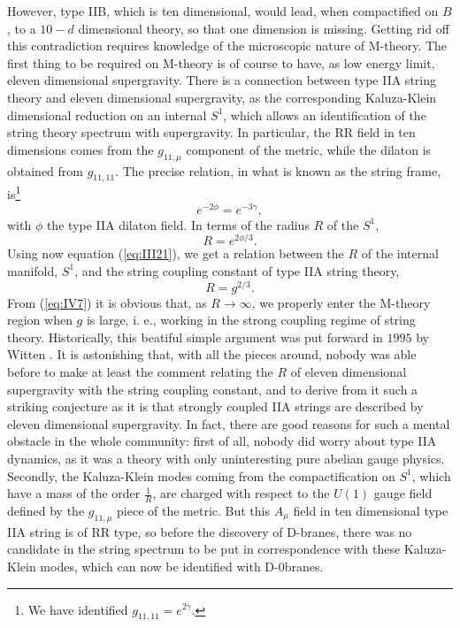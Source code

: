 However, type IIB, which is ten dimensional, would lead, when
compactified on $B$, to a $10-d$ dimensional theory, so that one
dimension is missing. Getting rid off this contradiction requires
knowledge of the microscopic nature of M-theory. The first thing
to be required on M-theory is of course to have, as low energy
limit, eleven dimensional supergravity. There is a connection
between type IIA string theory and eleven dimensional
supergravity, as the corresponding Kaluza-Klein dimensional
reduction on an internal $S^1$, which allows an identification of
the string theory spectrum with supergravity. In particular, the
RR field in ten dimensions comes from the $g_{11,\mu}$ component
of the metric, while the dilaton is obtained from $g_{11,11}$.
The precise relation, in what is known as the string frame,
is\footnote{We have identified $g_{11,11}=e^{2\gamma}$.}
\begin{equation}
e^{-2\phi} = e^{-3\gamma},
\label{eq:IV5}
\end{equation}
with $\phi$ the type IIA dilaton field. In terms of the radius $R$ of
the $S^1$,
\begin{equation}
R=e^{2\phi/3}.
\label{eq:IV6}
\end{equation}
Using now equation (\ref{eq:III21}), we get a relation between
the $R$ of the internal manifold, $S^1$, and the string coupling
constant of type IIA string theory,
\begin{equation}
R=g^{2/3}.
\label{eq:IV7}
\end{equation}
From (\ref{eq:IV7}) it is obvious that, as $R \rightarrow
\infty$, we properly enter the M-theory region when $g$ is large,
i. e., working in the strong coupling regime of string theory.
Historically, this beatiful simple argument was put forward in
$1995$ by Witten \cite{Wsvd}. It is astonishing that, with all the pieces
around, nobody was able before to make at least the comment
relating the $R$ of eleven dimensional supergravity with the
string coupling constant, and to derive from it such a striking 
conjecture as it is that strongly coupled IIA strings are described
by eleven dimensional supergravity. In fact, there are good
reasons for such a mental obstacle in the whole community: first of all, nobody
did worry about type IIA dynamics, as it was a theory with only
uninteresting pure abelian gauge physics. Secondly, the Kaluza-Klein modes coming from the
compactification on $S^1$, which have a mass of the order $\frac
{1}{R}$, are charged with respect to the $U(1)$
gauge field defined by the $g_{11,\mu}$ piece of the metric. But
this $A_{\mu}$ field in ten dimensional type IIA string is of RR
type, so before the discovery of D-branes, there was no
candidate in the string spectrum to be put in correspondence with
these Kaluza-Klein modes, which can now be identified with
D-$0$branes.
  
